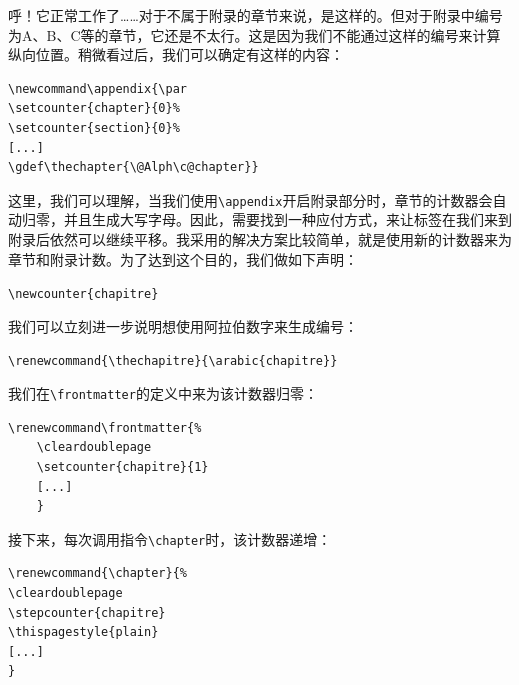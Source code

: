 呼！它正常工作了……对于不属于附录的章节来说，是这样的。但对于附录中编号为A、B、C等的章节，它还是不太行。这是因为我们不能通过这样的编号来计算纵向位置。稍微看过后，我们可以确定有这样的内容：

\begin{dmd}
\begin{verbatim}
\newcommand\appendix{\par 
\setcounter{chapter}{0}% 
\setcounter{section}{0}%
[...] 
\gdef\thechapter{\@Alph\c@chapter}}
\end{verbatim}
\end{dmd}

这里，我们可以理解，当我们使用\verb|\appendix|开启附录部分时，章节的计数器会自动归零，并且生成大写字母。因此，需要找到一种应付方式，来让标签在我们来到附录后依然可以继续平移。我采用的解决方案比较简单，就是使用新的计数器来为章节和附录计数。为了达到这个目的，我们做如下声明：

\begin{dmd}
\verb|\newcounter{chapitre}|
\end{dmd}

我们可以立刻进一步说明想使用阿拉伯数字来生成编号：

\begin{dmd}
\verb|\renewcommand{\thechapitre}{\arabic{chapitre}}|
\end{dmd}

我们在\verb+\frontmatter+的定义中来为该计数器归零：

\begin{dmd}
\begin{verbatim}
\renewcommand\frontmatter{% 
    \cleardoublepage 
    \setcounter{chapitre}{1} 
    [...]
    }
\end{verbatim}
\end{dmd}

接下来，每次调用指令\verb|\chapter|时，该计数器递增：

\begin{dmd}
\begin{verbatim}
\renewcommand{\chapter}{% 
\cleardoublepage 
\stepcounter{chapitre} 
\thispagestyle{plain} 
[...]
}
\end{verbatim}
\end{dmd}

